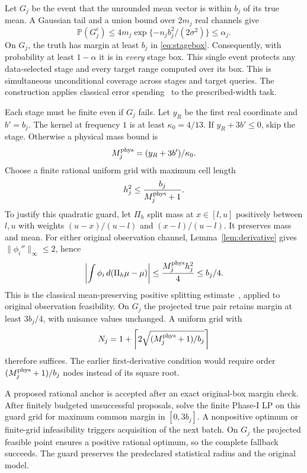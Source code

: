 \documentclass[10pt]{amsart}
\theoremstyle{definition}
\theoremstyle{remark}
\theoremstyle{plain}
\newcommand{\Prob}{\mathbb P}
\newcommand{\dd}{\,d}
\begin{document}
Let $G_j$ be the event that the unrounded mean vector is within $b_j$ of its true mean. A Gaussian tail and a union bound over $2m_j$ real channels give
\begin{equation}\label{eq:good}
 \Prob(G_j^c)\le4m_j\exp\{-n_jb_j^2/(2\sigma^2)\}\le\alpha_j.
\end{equation}
On $G_j$, the truth has margin at least $b_j$ in \eqref{eq:stagebox}. Consequently, with probability at least $1-\alpha$ it is in \emph{every} stage box. This single event protects any data-selected stage and every target range computed over its box. This is simultaneous unconditional coverage across stages and target queries. The construction applies classical error spending~\cite{howard} to the prescribed-width task.

Each stage must be finite even if $G_j$ fails. Let $y_R$ be the first real coordinate and $b'=b_j$. The kernel at frequency $1$ is at least $\kappa_0=4/13$. If $y_R+3b'\le0$, skip the stage. Otherwise a physical mass bound is
\[
 M_j^{\rm phys}=(y_R+3b')/\kappa_0.
\]
Choose a finite rational uniform grid with maximum cell length
\begin{equation}\label{eq:guard}
 h_j^2\le\frac{b_j}{M_j^{\rm phys}+1}.
\end{equation}
To justify this quadratic guard, let $\Pi_h$ split mass at $x\in[l,u]$ positively between $l,u$ with weights $(u-x)/(u-l)$ and $(x-l)/(u-l)$. It preserves mass and mean. For either original observation channel, Lemma~\ref{lem:derivative} gives $\|\phi_i''\|_\infty\le2$, hence
\[
 \left|\int\phi_i\dd(\Pi_h\mu-\mu)\right|
 \le \frac{M_j^{\rm phys}h_j^2}{4}\le b_j/4.
\]
This is the classical mean-preserving positive splitting estimate~\cite{pages}, applied to original observation feasibility. On $G_j$ the projected true pair retains margin at least $3b_j/4$, with nuisance values unchanged. A uniform grid with
\[
 N_j=1+\left\lceil2\sqrt{(M_j^{\rm phys}+1)/b_j}\right\rceil
\]
therefore suffices. The earlier first-derivative condition would require order $(M_j^{\rm phys}+1)/b_j$ nodes instead of its square root.

A proposed rational anchor is accepted after an exact original-box margin check. After finitely budgeted unsuccessful proposals, solve the finite Phase-I LP on this guard grid for maximum common margin in $[0,3b_j]$. A nonpositive optimum or finite-grid infeasibility triggers acquisition of the next batch. On $G_j$ the projected feasible point ensures a positive rational optimum, so the complete fallback succeeds. The guard preserves the predeclared statistical radius and the original model.
\end{document}
